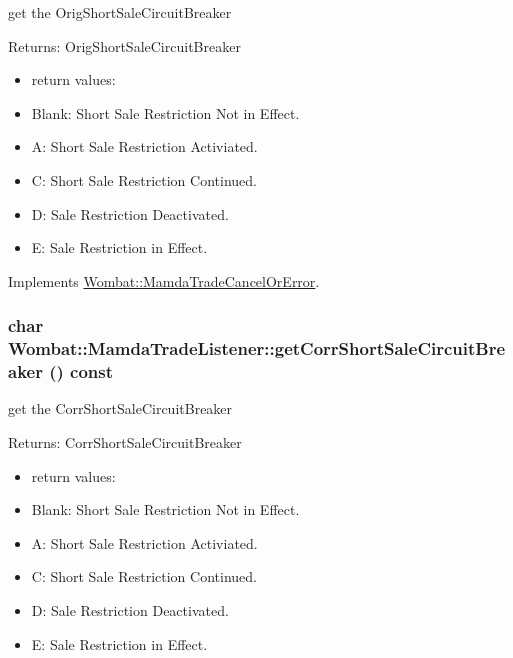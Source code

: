 get the Orig\-Short\-Sale\-Circuit\-Breaker 

\begin{Desc}
\item[Returns:]Orig\-Short\-Sale\-Circuit\-Breaker \begin{itemize}
\item return values: \item Blank: Short Sale Restriction Not in Effect. \item A: Short Sale Restriction Activiated. \item C: Short Sale Restriction Continued. \item D: Sale Restriction Deactivated. \item E: Sale Restriction in Effect. \end{itemize}
\end{Desc}


Implements \hyperlink{classWombat_1_1MamdaTradeCancelOrError_54da84a40ec7c8cba6bc119c4fac7614}{Wombat::Mamda\-Trade\-Cancel\-Or\-Error}.\hypertarget{classWombat_1_1MamdaTradeListener_e7d9e2149cece7e7af95aaf102623d91}{
\subsubsection[getCorrShortSaleCircuitBreaker]{\setlength{\rightskip}{0pt plus 5cm}char Wombat::Mamda\-Trade\-Listener::get\-Corr\-Short\-Sale\-Circuit\-Breaker () const}}
\label{classWombat_1_1MamdaTradeListener_e7d9e2149cece7e7af95aaf102623d91}


get the Corr\-Short\-Sale\-Circuit\-Breaker 

\begin{Desc}
\item[Returns:]Corr\-Short\-Sale\-Circuit\-Breaker \begin{itemize}
\item return values: \item Blank: Short Sale Restriction Not in Effect. \item A: Short Sale Restriction Activiated. \item C: Short Sale Restriction Continued. \item D: Sale Restriction Deactivated. \item E: Sale Restriction in Effect. \end{itemize}
\end{Desc}


